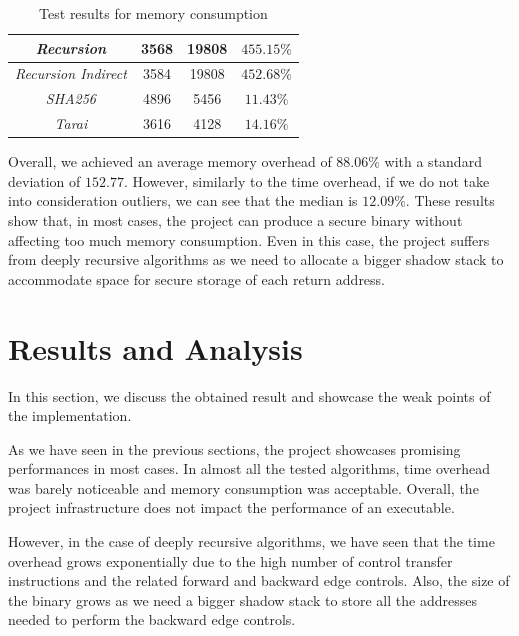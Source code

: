 \begin{table}
\begin{tabular}{|c|c|c|c|}
    \hline
    \textit{Recursion}                   & 3568                         & 19808                        & $455.15\%$               \\
    \hline
    \textit{Recursion Indirect}          & 3584                         & 19808                        & $452.68\%$               \\
    \hline
    \textit{SHA256}                      & 4896                         & 5456                         & $11.43\%$                \\
    \hline
    \textit{Tarai}                       & 3616                         & 4128                         & $14.16\%$                \\
    \hline
  \end{tabular}
  \caption{Test results for memory consumption}
  \label{tab:binsize}
\end{table}

Overall, we achieved an average memory overhead of $88.06\%$ with a standard deviation
of $152.77$. However, similarly to the time overhead, if we do not take into
consideration outliers, we can see that the median is $12.09 \%$. These results
show that, in most cases, the project can produce a secure binary without
affecting too much memory consumption. Even in this case, the project suffers
from deeply recursive algorithms as we need to allocate a bigger shadow stack to
accommodate space for secure storage of each return address.

\section{Results and Analysis}
\label{sec:pa_results}

In this section, we discuss the obtained result and showcase the weak points of
the implementation.

As we have seen in the previous sections, the project showcases promising performances
in most cases. In almost all the tested algorithms, time overhead was barely noticeable
and memory consumption was acceptable. Overall, the project infrastructure does not
impact the performance of an executable.

However, in the case of deeply recursive algorithms, we have seen that the time overhead
grows exponentially due to the high number of control transfer instructions and the
related forward and backward edge controls. Also, the size of the binary grows as
we need a bigger shadow stack to store all the addresses needed to perform the backward
edge controls.

